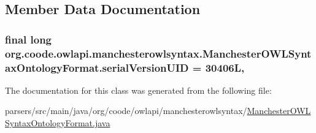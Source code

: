 \subsection{Member Data Documentation}
\hypertarget{classorg_1_1coode_1_1owlapi_1_1manchesterowlsyntax_1_1_manchester_o_w_l_syntax_ontology_format_ae3b3c79d4fc36b8ad5264e7ecd7326a0}{
\subsubsection[{serial\-Version\-U\-I\-D}]{\setlength{\rightskip}{0pt plus 5cm}final long org.\-coode.\-owlapi.\-manchesterowlsyntax.\-Manchester\-O\-W\-L\-Syntax\-Ontology\-Format.\-serial\-Version\-U\-I\-D = 30406\-L\hspace{0.3cm}{\ttfamily [static]}, {\ttfamily [private]}}}\label{classorg_1_1coode_1_1owlapi_1_1manchesterowlsyntax_1_1_manchester_o_w_l_syntax_ontology_format_ae3b3c79d4fc36b8ad5264e7ecd7326a0}


The documentation for this class was generated from the following file\-:\begin{DoxyCompactItemize}
\item 
parsers/src/main/java/org/coode/owlapi/manchesterowlsyntax/\hyperlink{_manchester_o_w_l_syntax_ontology_format_8java}{Manchester\-O\-W\-L\-Syntax\-Ontology\-Format.\-java}\end{DoxyCompactItemize}
